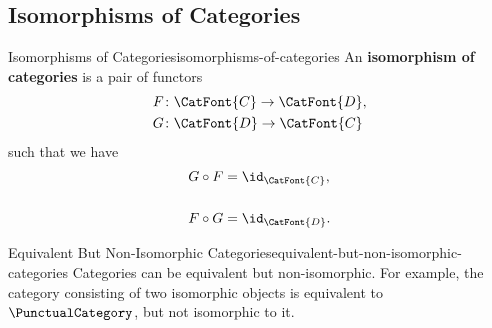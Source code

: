 \subsection{Isomorphisms of Categories}\label{subsection-isomorphisms-of-categories}
\begin{definition}{Isomorphisms of Categories}{isomorphisms-of-categories}%
    An \textbf{isomorphism of categories} is a pair of functors
    \begin{align*}
        F &\colon \CatFont{C}\to\CatFont{D},\\
        G &\colon \CatFont{D}\to\CatFont{C}
    \end{align*}
    such that we have
    \begin{align*}
        G\circ F &= \id_{\CatFont{C}},\\\\
        F\circ G &= \id_{\CatFont{D}}.
    \end{align*}
\end{definition}
\begin{example}{Equivalent But Non-Isomorphic Categories}{equivalent-but-non-isomorphic-categories}%
    Categories can be equivalent but non-isomorphic. For example, the category consisting of two isomorphic objects is equivalent to $\PunctualCategory$, but not isomorphic to it.
\end{example}
